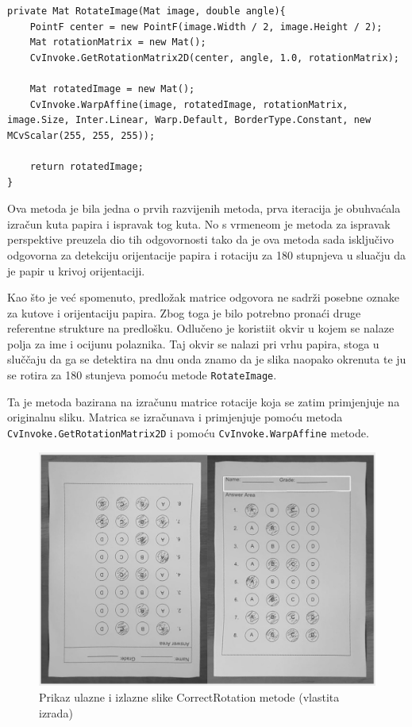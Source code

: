 \documentclass{foi}
\begin{document}
\pagebreak
\begin{lstlisting}[caption={Metoda za rotaciju slike}]
private Mat RotateImage(Mat image, double angle){
    PointF center = new PointF(image.Width / 2, image.Height / 2);
    Mat rotationMatrix = new Mat();
    CvInvoke.GetRotationMatrix2D(center, angle, 1.0, rotationMatrix);

    Mat rotatedImage = new Mat();
    CvInvoke.WarpAffine(image, rotatedImage, rotationMatrix, image.Size, Inter.Linear, Warp.Default, BorderType.Constant, new MCvScalar(255, 255, 255));

    return rotatedImage;
}
\end{lstlisting}

Ova metoda je bila jedna o prvih razvijenih metoda, prva iteracija je obuhvaćala izračun kuta papira i ispravak tog kuta. No s vrmeneom je metoda za ispravak perspektive preuzela dio tih odgovornosti tako da je ova metoda sada isključivo odgovorna za detekciju orijentacije papira i rotaciju za 180 stupnjeva u sluačju da je papir u krivoj orijentaciji.

Kao što je već spomenuto, predložak matrice odgovora ne sadrži posebne oznake za kutove i orijentaciju papira. Zbog toga je bilo potrebno pronaći druge referentne strukture na predlošku. Odlučeno je koristiit okvir u kojem se nalaze polja za ime i ocijunu polaznika. Taj okvir se nalazi pri vrhu papira, stoga u sluččaju da ga se detektira na dnu onda znamo da je slika naopako okrenuta te ju se rotira za 180 stunjeva pomoću metode \texttt{RotateImage}. 

Ta je metoda bazirana na izračunu matrice rotacije koja se zatim primjenjuje na originalnu sliku. Matrica se izračunava i primjenjuje pomoću metoda \texttt{CvInvoke.GetRotationMatrix2D} i  pomoću \texttt{CvInvoke.WarpAffine} metode.

\begin{figure}[H]
\centering
\includegraphics[width=0.7\linewidth]{slike/RotationComparison.png}
\caption{Prikaz ulazne i izlazne slike CorrectRotation metode (vlastita izrada)}
\end{figure}
\end{document}
